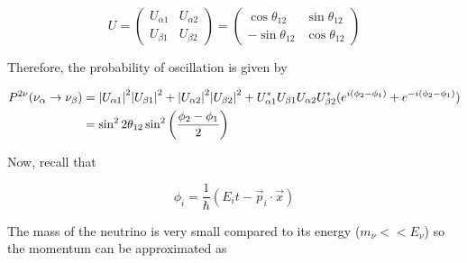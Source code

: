 \begin{equation}	
U = 
\begin{pmatrix}
U_{\alpha 1} & U_{\alpha 2} \\
U_{\beta 1} & U_{\beta 2}
\end{pmatrix} = 
\begin{pmatrix}
\cos\theta_{12} & \sin\theta_{12} \\
-\sin\theta_{12} & \cos\theta_{12}
\end{pmatrix}
\end{equation}

\noindent Therefore, the probability of oscillation is given by

\begin{equation}
\begin{split}
P^{2\nu}(\nu_\alpha \rightarrow \nu_\beta) 
&=  \abs{U_{\alpha 1}}^{2}\abs{U_{\beta 1}}^2 + \abs{U_{\alpha 2}}^2\abs{U_{\beta 2}}^2 +
U^{*}_{\alpha 1}U_{\beta 1}U_{\alpha 2}U^{*}_{\beta 2}(e^{i(\phi_2-\phi_1)} + e^{-i(\phi_2 - \phi_1)}) \\ 
&= \sin^22\theta_{12}\sin^2\left(\frac{\phi_2-\phi_1}{2}\right)
\end{split}
\end{equation}

\noindent Now, recall that 

\begin{equation}
	\phi_i = \frac{1}{\hbar}(E_{i}t - \vec{p}_{i}\cdot\vec{x})
\end{equation}

\noindent The mass of the neutrino is very small compared to its energy ($m_\nu << E_\nu$) so 
the momentum can be approximated as

